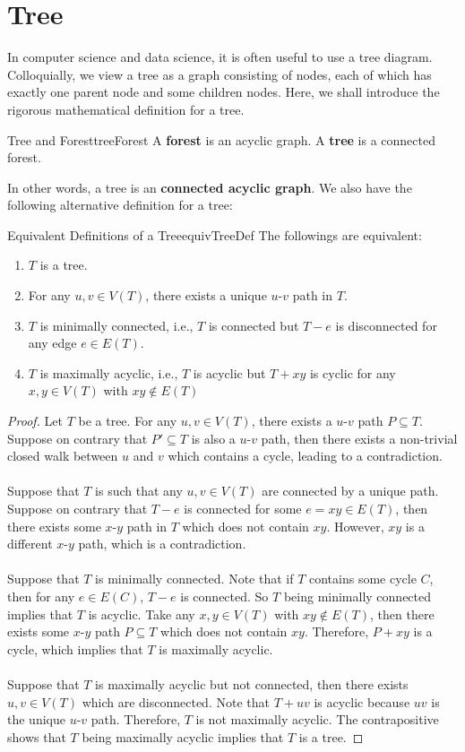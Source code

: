 \documentclass[math]{amznotes}
\theoremstyle{remark}
\newcommand{\0}{\mathbf{0}}
\newcommand{\1}{\mathbf{1}}
\begin{document}
\section{Tree}
In computer science and data science, it is often useful to use a tree diagram. Colloquially, we view a tree as a graph consisting of nodes, each of which has exactly one parent node and some children nodes. Here, we shall introduce the rigorous mathematical definition for a tree.
\begin{dfnbox}{Tree and Forest}{treeForest}
    A {\color{red} \textbf{forest}} is an acyclic graph. A {\color{red} \textbf{tree}} is a connected forest.
\end{dfnbox}
In other words, a tree is an \textbf{connected acyclic graph}. We also have the following alternative definition for a tree:
\begin{thmbox}{Equivalent Definitions of a Tree}{equivTreeDef}
    The followings are equivalent:
    \begin{enumerate}
        \item $T$ is a tree.
        \item For any $u, v \in V(T)$, there exists a unique $u$-$v$ path in $T$.
        \item $T$ is minimally connected, i.e., $T$ is connected but $T - e$ is disconnected for any edge $e \in E(T)$.
        \item $T$ is maximally acyclic, i.e., $T$ is acyclic but $T + xy$ is cyclic for any $x, y \in V(T)$ with $xy \notin E(T)$ 
    \end{enumerate}
    \tcblower
    \begin{proof}
        Let $T$ be a tree. For any $u, v \in V(T)$, there exists a $u$-$v$ path $P \subseteq T$. Suppose on contrary that $P' \subseteq T$ is also a $u$-$v$ path, then there exists a non-trivial closed walk between $u$ and $v$ which contains a cycle, leading to a contradiction.
        \\\\
        Suppose that $T$ is such that any $u, v \in V(T)$ are connected by a unique path. Suppose on contrary that $T - e$ is connected for some $e = xy \in E(T)$, then there exists some $x$-$y$ path in $T$ which does not contain $xy$. However, $xy$ is a different $x$-$y$ path, which is a contradiction.
        \\\\
        Suppose that $T$ is minimally connected. Note that if $T$ contains some cycle $C$, then for any $e \in E(C)$, $T - e$ is connected. So $T$ being minimally connected implies that $T$ is acyclic. Take any $x, y \in V(T)$ with $xy \notin E(T)$, then there exists some $x$-$y$ path $P \subseteq T$ which does not contain $xy$. Therefore, $P + xy$ is a cycle, which implies that $T$ is maximally acyclic.
        \\\\
        Suppose that $T$ is maximally acyclic but not connected, then there exists $u, v \in V(T)$ which are disconnected. Note that $T + uv$ is acyclic because $uv$ is the unique $u$-$v$ path. Therefore, $T$ is not maximally acyclic. The contrapositive shows that $T$ being maximally acyclic implies that $T$ is a tree.
    \end{proof}
\end{thmbox}
\end{document}
